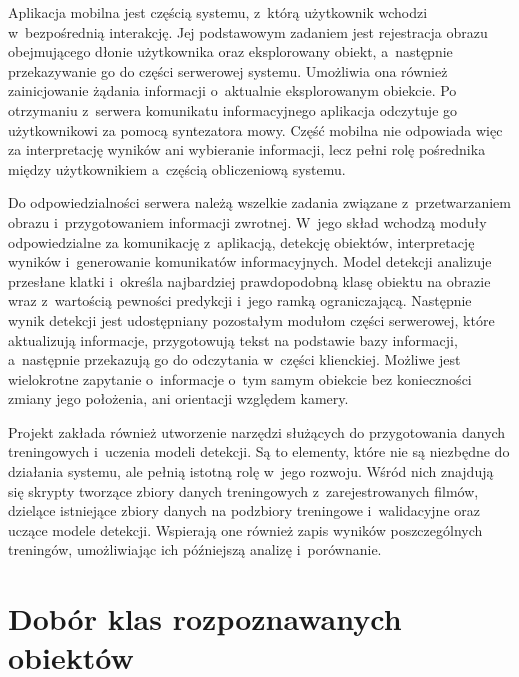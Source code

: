 Aplikacja mobilna jest częścią systemu, z~którą użytkownik wchodzi w~bezpośrednią interakcję. Jej podstawowym zadaniem jest rejestracja obrazu obejmującego dłonie użytkownika oraz eksplorowany obiekt, a~następnie przekazywanie go do części serwerowej systemu. Umożliwia ona również zainicjowanie żądania informacji o~aktualnie eksplorowanym obiekcie. Po otrzymaniu z~serwera komunikatu informacyjnego aplikacja odczytuje go użytkownikowi za pomocą syntezatora mowy. Część mobilna nie odpowiada więc za interpretację wyników ani wybieranie informacji, lecz pełni rolę pośrednika między użytkownikiem a~częścią obliczeniową systemu.

Do odpowiedzialności serwera należą wszelkie zadania związane z~przetwarzaniem obrazu i~przygotowaniem informacji zwrotnej. W~jego skład wchodzą moduły odpowiedzialne za komunikację z~aplikacją, detekcję obiektów, interpretację wyników i~generowanie komunikatów informacyjnych. Model detekcji analizuje przesłane klatki i~określa najbardziej prawdopodobną klasę obiektu na obrazie wraz z~wartością pewności predykcji i~jego ramką ograniczającą. Następnie wynik detekcji jest udostępniany pozostałym modułom części serwerowej, które aktualizują informacje, przygotowują tekst na podstawie bazy informacji, a~następnie przekazują go do odczytania w~części klienckiej. Możliwe jest wielokrotne zapytanie o~informacje o~tym samym obiekcie bez konieczności zmiany jego położenia, ani orientacji względem kamery.

Projekt zakłada również utworzenie narzędzi służących do przygotowania danych treningowych i~uczenia modeli detekcji. Są to elementy, które nie są niezbędne do działania systemu, ale pełnią istotną rolę w~jego rozwoju. Wśród nich znajdują się skrypty tworzące zbiory danych treningowych z~zarejestrowanych filmów, dzielące istniejące zbiory danych na podzbiory treningowe i~walidacyjne oraz uczące modele detekcji. Wspierają one również zapis wyników poszczególnych treningów, umożliwiając ich późniejszą analizę i~porównanie.

\section{Dobór klas rozpoznawanych obiektów}

